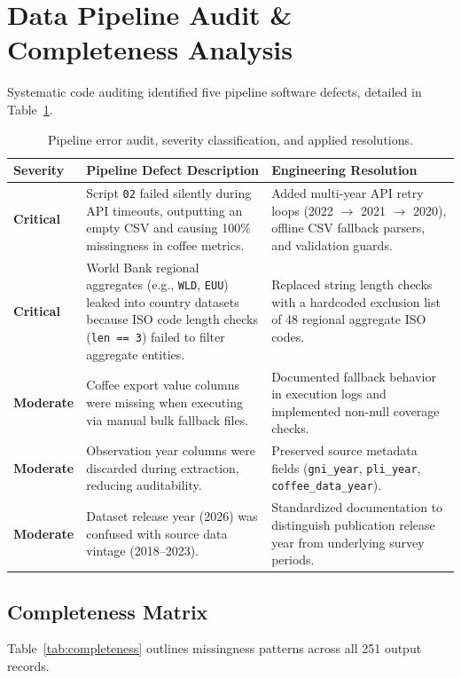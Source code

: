 \documentclass[11pt,a4paper]{article}
\newcommand{\bad}{\textcolor{red!70!black}{\textbf{Critical}}}
\newcommand{\warn}{\textcolor{orange!80!black}{\textbf{Moderate}}}
\begin{document}
\section{Data Pipeline Audit \& Completeness Analysis}

Systematic code auditing identified five pipeline software defects, detailed in Table~\ref{tab:issues}.

\begin{table}[h]
\centering
\small
\begin{tabular}{@{}p{2.2cm}p{6.8cm}p{4.8cm}@{}}
\toprule
\textbf{Severity} & \textbf{Pipeline Defect Description} & \textbf{Engineering Resolution} \\
\midrule
\bad &
Script \texttt{02} failed silently during API timeouts, outputting an empty CSV and causing 100\% missingness in coffee metrics. &
Added multi-year API retry loops (2022 $\rightarrow$ 2021 $\rightarrow$ 2020), offline CSV fallback parsers, and validation guards. \\
\addlinespace
\bad &
World Bank regional aggregates (e.g., \texttt{WLD}, \texttt{EUU}) leaked into country datasets because ISO code length checks (\texttt{len == 3}) failed to filter aggregate entities. &
Replaced string length checks with a hardcoded exclusion list of 48 regional aggregate ISO codes. \\
\addlinespace
\warn &
Coffee export value columns were missing when executing via manual bulk fallback files. &
Documented fallback behavior in execution logs and implemented non-null coverage checks. \\
\addlinespace
\warn &
Observation year columns were discarded during extraction, reducing auditability. &
Preserved source metadata fields (\texttt{gni\_year}, \texttt{pli\_year}, \texttt{coffee\_data\_year}). \\
\addlinespace
\warn &
Dataset release year (2026) was confused with source data vintage (2018--2023). &
Standardized documentation to distinguish publication release year from underlying survey periods. \\
\bottomrule
\end{tabular}
\caption{Pipeline error audit, severity classification, and applied resolutions.}
\label{tab:issues}
\end{table}

\subsection{Completeness Matrix}
Table~\ref{tab:completeness} outlines missingness patterns across all 251 output records.
\end{document}
